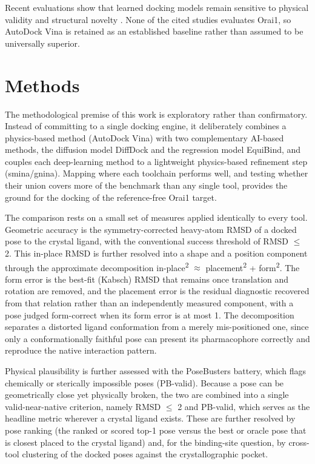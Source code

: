 Recent evaluations show that learned docking models remain sensitive to physical validity and structural novelty \cite{ref013}. None of the cited studies evaluates Orai1, so AutoDock Vina is retained as an established baseline rather than assumed to be universally superior.

\clearpage
\hypertarget{methods}{%
\chapter{\texorpdfstring{Methods }{Methods }}\label{methods}}

The methodological premise of this work is exploratory rather than confirmatory. Instead of committing to a single docking engine, it deliberately combines a physics-based method (AutoDock Vina) with two complementary AI-based methods, the diffusion model DiffDock and the regression model EquiBind, and couples each deep-learning method to a lightweight physics-based refinement step (smina/gnina). Mapping where each toolchain performs well, and testing whether their union covers more of the benchmark than any single tool, provides the ground for the docking of the reference-free Orai1 target.

The comparison rests on a small set of measures applied identically to every tool. Geometric accuracy is the symmetry-corrected heavy-atom RMSD of a docked pose to the crystal ligand, with the conventional success threshold of RMSD \ensuremath{\leq} 2\angstrom{}. This in-place RMSD is further resolved into a shape and a position component through the approximate decomposition in-place\textsuperscript{2} \ensuremath{\approx} placement\textsuperscript{2} + form\textsuperscript{2}. The form error is the best-fit (Kabsch) RMSD that remains once translation and rotation are removed, and the placement error is the residual diagnostic recovered from that relation rather than an independently measured component, with a pose judged form-correct when its form error is at most 1\angstrom{}. The decomposition separates a distorted ligand conformation from a merely mis-positioned one, since only a conformationally faithful pose can present its pharmacophore correctly and reproduce the native interaction pattern.

Physical plausibility is further assessed with the PoseBusters battery, which flags chemically or sterically impossible poses (PB-valid). Because a pose can be geometrically close yet physically broken, the two are combined into a single valid-near-native criterion, namely RMSD \ensuremath{\leq} 2\angstrom{} and PB-valid, which serves as the headline metric wherever a crystal ligand exists. These are further resolved by pose ranking (the ranked or scored top-1 pose versus the best or oracle pose that is closest placed to the crystal ligand) and, for the binding-site question, by cross-tool clustering of the docked poses against the crystallographic pocket.


